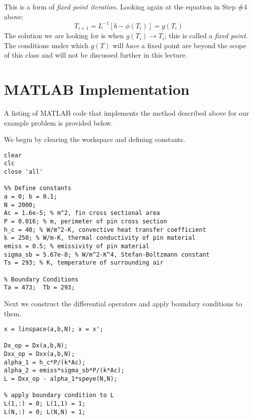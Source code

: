 This is a form of \emph{fixed point iteration}. Looking again at the equation in Step \#4 above:
\begin{equation*}
T_{i+1} = L^{-1}\left[b-\phi(T_{i})\right] = g(T_i)
\end{equation*}
The solution we are looking for is when $g(T_i) \rightarrow T_i$; this is called a \emph{fixed point}.  The conditions under which $g(T)$ will \emph{have} a fixed point are beyond the scope of this class and will not be discussed further in this lecture.

\section{MATLAB Implementation}
A listing of MATLAB code that implements the method described above for our example problem is provided below.

\noindent We begin by clearing the workspace and defining constants.
\begin{lstlisting}[style=myMatlab,name=lec32n-ex]
clear
clc
close 'all'

%% Define constants
a = 0; b = 0.1;
N = 2000;
Ac = 1.6e-5; % m^2, fin cross sectional area
P = 0.016; % m, perimeter of pin cross section
h_c = 40; % W/m^2-K, convective heat transfer coefficient 
k = 250; % W/m-K, thermal conductivity of pin material
emiss = 0.5; % emissivity of pin material
sigma_sb = 5.67e-8; % W/m^2-K^4, Stefan-Boltzmann constant
Ts = 293; % K, temperature of surrounding air

% Boundary Conditions
Ta = 473;  Tb = 293;
\end{lstlisting}


\noindent Next we construct the differential operators and apply boundary conditions to them.
\begin{lstlisting}[style=myMatlab,name=lec32n-ex]
% Discretize the space and get Operators
x = linspace(a,b,N); x = x';

Dx_op = Dx(a,b,N);
Dxx_op = Dxx(a,b,N);
alpha_1 = h_c*P/(k*Ac);
alpha_2 = emiss*sigma_sb*P/(k*Ac);
L = Dxx_op - alpha_1*speye(N,N);

% apply boundary condition to L
L(1,:) = 0; L(1,1) = 1; 
L(N,:) = 0; L(N,N) = 1;

\end{lstlisting}

